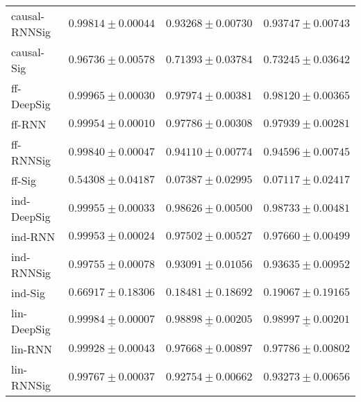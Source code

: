 \begin{tabular}{llll}
causal-RNNSig  &                           $ 0.99814 \pm 0.00044 $ &                           $ 0.93268 \pm 0.00730 $ &                           $ 0.93747 \pm 0.00743 $ \\
causal-Sig     &                           $ 0.96736 \pm 0.00578 $ &                           $ 0.71393 \pm 0.03784 $ &                           $ 0.73245 \pm 0.03642 $ \\
ff-DeepSig     &                           $ 0.99965 \pm 0.00030 $ &                           $ 0.97974 \pm 0.00381 $ &                           $ 0.98120 \pm 0.00365 $ \\
ff-RNN         &                           $ 0.99954 \pm 0.00010 $ &                           $ 0.97786 \pm 0.00308 $ &                           $ 0.97939 \pm 0.00281 $ \\
ff-RNNSig      &                           $ 0.99840 \pm 0.00047 $ &                           $ 0.94110 \pm 0.00774 $ &                           $ 0.94596 \pm 0.00745 $ \\
ff-Sig         &                           $ 0.54308 \pm 0.04187 $ &                           $ 0.07387 \pm 0.02995 $ &                           $ 0.07117 \pm 0.02417 $ \\
ind-DeepSig    &                           $ 0.99955 \pm 0.00033 $ &               $  \mathbf{ 0.98626 \pm 0.00500 } $ &               $  \mathbf{ 0.98733 \pm 0.00481 } $ \\
ind-RNN        &                           $ 0.99953 \pm 0.00024 $ &                           $ 0.97502 \pm 0.00527 $ &                           $ 0.97660 \pm 0.00499 $ \\
ind-RNNSig     &                           $ 0.99755 \pm 0.00078 $ &                           $ 0.93091 \pm 0.01056 $ &                           $ 0.93635 \pm 0.00952 $ \\
ind-Sig        &                           $ 0.66917 \pm 0.18306 $ &                           $ 0.18481 \pm 0.18692 $ &                           $ 0.19067 \pm 0.19165 $ \\
lin-DeepSig    &  $  \mathbf{ \underline{ 0.99984 \pm 0.00007 }} $ &  $  \mathbf{ \underline{ 0.98898 \pm 0.00205 }} $ &  $  \mathbf{ \underline{ 0.98997 \pm 0.00201 }} $ \\
lin-RNN        &                           $ 0.99928 \pm 0.00043 $ &                           $ 0.97668 \pm 0.00897 $ &                           $ 0.97786 \pm 0.00802 $ \\
lin-RNNSig     &                           $ 0.99767 \pm 0.00037 $ &                           $ 0.92754 \pm 0.00662 $ &                           $ 0.93273 \pm 0.00656 $ \\

\end{tabular}
